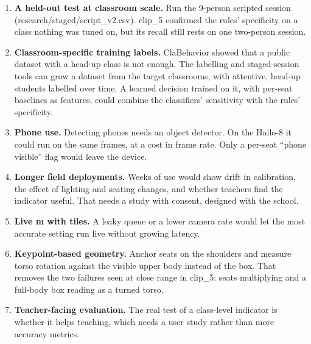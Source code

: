 \begin{enumerate}
\def\labelenumi{\arabic{enumi}.}
\tightlist
\item
  \textbf{A held-out test at classroom scale.} Run the 9-person scripted session (research/staged/script\_v2.csv). clip\_5 confirmed the rules' specificity on a class nothing was tuned on, but its recall still rests on one two-person session.
\item
  \textbf{Classroom-specific training labels.} ClaBehavior showed that a public dataset with a head-up class is not enough. The labelling and staged-session tools can grow a dataset from the target classrooms, with attentive, head-up students labelled over time. A learned decision trained on it, with per-seat baselines as features, could combine the classifiers' sensitivity with the rules' specificity.
\item
  \textbf{Phone use.} Detecting phones needs an object detector. On the Hailo-8 it could run on the same frames, at a cost in frame rate. Only a per-seat ``phone visible'' flag would leave the device.
\item
  \textbf{Longer field deployments.} Weeks of use would show drift in calibration, the effect of lighting and seating changes, and whether teachers find the indicator useful. That needs a study with consent, designed with the school.
\item
  \textbf{Live m with tiles.} A leaky queue or a lower camera rate would let the most accurate setting run live without growing latency.
\item
  \textbf{Keypoint-based geometry.} Anchor seats on the shoulders and measure torso rotation against the visible upper body instead of the box. That removes the two failures seen at close range in clip\_5: seats multiplying and a full-body box reading as a turned torso.
\item
  \textbf{Teacher-facing evaluation.} The real test of a class-level indicator is whether it helps teaching, which needs a user study rather than more accuracy metrics.
\end{enumerate}

